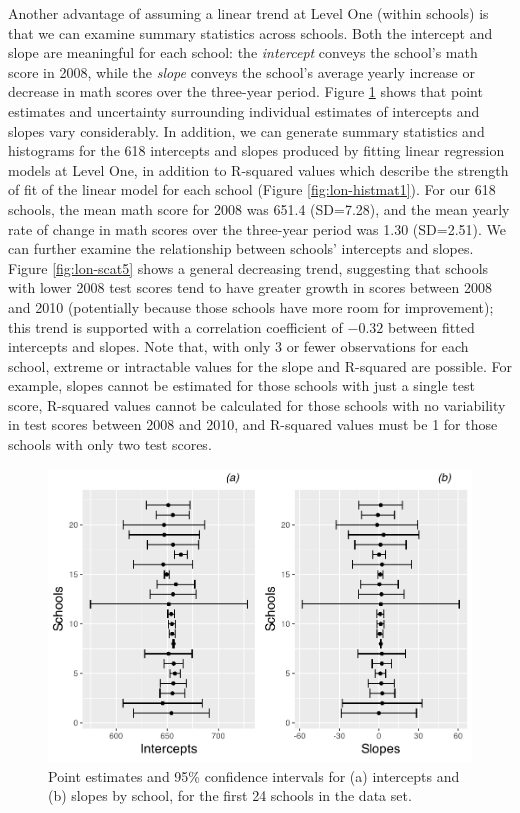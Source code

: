 \documentclass[
]{krantz}
\begin{document}
Another advantage of assuming a linear trend at Level One (within schools) is that we can examine summary statistics across schools. Both the intercept and slope are meaningful for each school: the \emph{intercept} conveys the school's math score in 2008, while the \emph{slope} conveys the school's average yearly increase or decrease in math scores over the three-year period. Figure \ref{fig:lon-cis1} shows that point estimates and uncertainty surrounding individual estimates of intercepts and slopes vary considerably. In addition, we can generate summary statistics and histograms for the 618 intercepts and slopes produced by fitting linear regression models at Level One, in addition to R-squared values which describe the strength of fit of the linear model for each school (Figure \ref{fig:lon-histmat1}). For our 618 schools, the mean math score for 2008 was 651.4 (SD=7.28), and the mean yearly rate of change in math scores over the three-year period was 1.30 (SD=2.51). We can further examine the relationship between schools' intercepts and slopes. Figure \ref{fig:lon-scat5} shows a general decreasing trend, suggesting that schools with lower 2008 test scores tend to have greater growth in scores between 2008 and 2010 (potentially because those schools have more room for improvement); this trend is supported with a correlation coefficient of \(-0.32\) between fitted intercepts and slopes. Note that, with only 3 or fewer observations for each school, extreme or intractable values for the slope and R-squared are possible. For example, slopes cannot be estimated for those schools with just a single test score, R-squared values cannot be calculated for those schools with no variability in test scores between 2008 and 2010, and R-squared values must be 1 for those schools with only two test scores.



\begin{figure}

{\centering \includegraphics[width=0.6\linewidth]{bookdown-BeyondMLR_files/figure-latex/lon-cis1-1} 

}

\caption{Point estimates and 95\% confidence intervals for (a) intercepts and (b) slopes by school, for the first 24 schools in the data set.}\label{fig:lon-cis1}
\end{figure}
\end{document}
